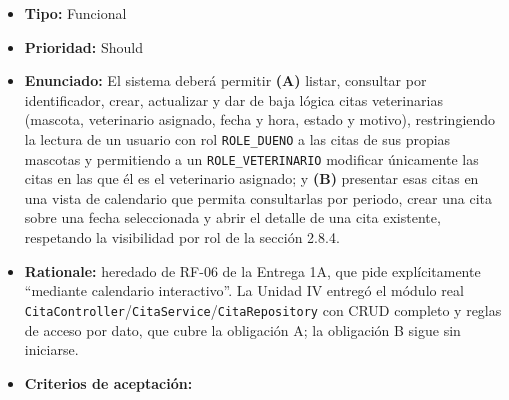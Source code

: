 \documentclass[
  spanish,
]{article}
\providecommand{\tightlist}{%
  \setlength{\itemsep}{0pt}\setlength{\parskip}{0pt}}
\begin{document}
\begin{itemize}
\tightlist
\item
  \textbf{Tipo:} Funcional
\item
  \textbf{Prioridad:} Should
\item
  \textbf{Enunciado:} El sistema deberá permitir \textbf{(A)} listar,
  consultar por identificador, crear, actualizar y dar de baja lógica
  citas veterinarias (mascota, veterinario asignado, fecha y hora,
  estado y motivo), restringiendo la lectura de un usuario con rol
  \texttt{ROLE\_\allowbreak{}DUENO} a las citas de sus propias mascotas y permitiendo
  a un \texttt{ROLE\_\allowbreak{}VETERINARIO} modificar únicamente las citas en las
  que él es el veterinario asignado; y \textbf{(B)} presentar esas citas
  en una vista de calendario que permita consultarlas por periodo, crear
  una cita sobre una fecha seleccionada y abrir el detalle de una cita
  existente, respetando la visibilidad por rol de la sección 2.8.4.
\item
  \textbf{Rationale:} heredado de RF-06 de la Entrega 1A, que pide
  explícitamente ``mediante calendario interactivo''. La Unidad IV
  entregó el módulo real
  \texttt{Cita\allowbreak{}Controller}/\texttt{Cita\allowbreak{}Service}/\texttt{Cita\allowbreak{}Repository}
  con CRUD completo y reglas de acceso por dato, que cubre la obligación
  A; la obligación B sigue sin iniciarse.
\item
  \textbf{Criterios de aceptación:}


\end{itemize}
\end{document}
